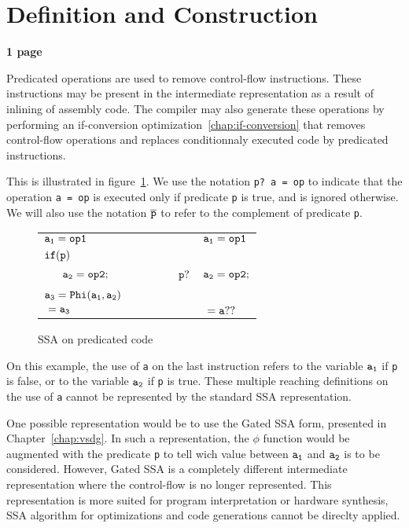 \section{Definition and Construction}

\textbf{1 page}


Predicated operations are used to remove control-flow instructions.
These instructions may be present in the intermediate representation
as a result of inlining of assembly code. The compiler may also
generate these operations by performing an if-conversion
optimization~\ref{chap:if-conversion} that removes control-flow
operations and replaces conditionnaly executed code by predicated
instructions.

This is illustrated in figure~\ref{fig:op_pred0}. We use the notation
{\tt p? a = op} to indicate that the operation {\tt a = op} is
executed only if predicate {\tt p} is true, and is ignored
otherwise. We will also use the notation ${\tt \overline{p}}$ to refer
to the complement of predicate {\tt p}.

\begin{figure}
\begin{center}
\footnotesize
\begin{tabular}{llll}
${\tt a_1 = op1}$ & & & ${\tt a_1 = op1}$ \\
${\tt if (p)}$        & & & \\
${\tt\ \ \ \ \ a_2 = op2;}$ & \ \ \ \ \  & ${\tt p?}$ & ${\tt a_2 = op2;}$ \\
${\tt a_3 = Phi(a_1, a_2)}$ & & & \\
${\tt \ = a_3}$ & & & ${\tt \ = a??}$ \\
\end{tabular}
\caption{SSA on predicated code}
\label{fig:op_pred0}
\end{center}
\end{figure}

On this example, the use of {\tt a} on the last instruction refers to
the variable ${\tt a_1}$ if {\tt p} is false, or to the variable ${\tt
  a_2}$ if {\tt p} is true. These multiple reaching definitions on the
use of {\tt a} cannot be represented by the standard SSA
representation.

One possible representation would be to use the Gated SSA form,
presented in Chapter~\ref{chap:vsdg}. In such a representation, the
$\phi$ function would be augmented with the predicate {\tt p} to tell
wich value between ${\tt a_1}$ and ${\tt a_2}$ is to be
considered. However, Gated SSA is a completely different intermediate
representation where the control-flow is no longer represented. This
representation is more suited for program interpretation or hardware
synthesis, SSA algorithm for optimizations and code generations cannot
be direclty applied.

